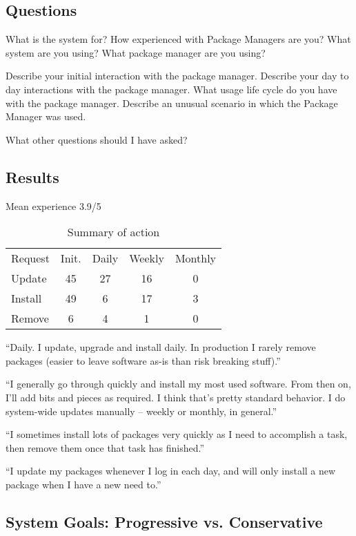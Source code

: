 \subsection{Questions}

What is the system for?
How experienced with Package Managers are you?
What system are you using?
What package manager are you using?


Describe your initial interaction with the package manager.
Describe your day to day interactions with the package manager.
What usage life cycle do you have with the package manager.
Describe an unusual scenario in which the Package Manager was used.

What other questions should I have asked?

\subsection{Results}

Mean experience 3.9/5 

\begin{table}
\begin{tabular}{l | c | c | c | c |}
Request & Init. & Daily & Weekly & Monthly \\
Update  & 45 & 27 & 16 & 0 \\
Install & 49 & 6 & 17 & 3 \\
Remove & 6 & 4 & 1 & 0\\
\end{tabular}
\caption{Summary of action}
\label{tablelabel}
\end{table}

``Daily. I update, upgrade and install daily. In production I rarely remove packages (easier to leave software as-is than risk breaking stuff).''

``I generally go through quickly and install my most used software. From then on, I'll add bits and pieces as required.
 I think that's pretty standard behavior. I do system-wide updates manually -- weekly or monthly, in general.''

``I sometimes install lots of packages very quickly as I need to accomplish a task, then remove them once that task has finished.''

``I update my packages whenever I log in each day, and will only install a new package when I have a new need to.''

\subsection{System Goals: Progressive vs. Conservative}



